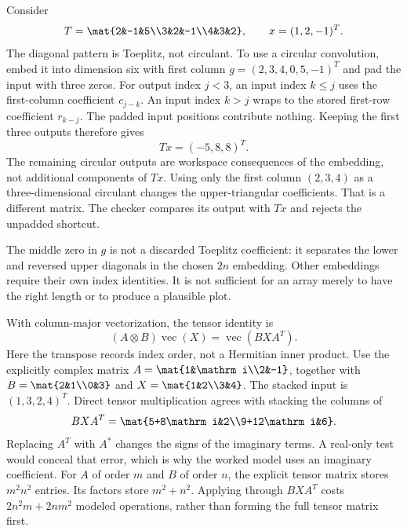 Consider
\[
T=\mat{2&-1&5\\3&2&-1\\4&3&2},\qquad x=(1,2,-1)^T.
\]
The diagonal pattern is Toeplitz, not circulant. To use a circular convolution, embed it into dimension six with first column $g=(2,3,4,0,5,-1)^T$ and pad the input with three zeros.
For output index $j<3$, an input index $k\le j$ uses the first-column coefficient $c_{j-k}$. An input index $k>j$ wraps to the stored first-row coefficient $r_{k-j}$. The padded input positions contribute nothing. Keeping the first three outputs therefore gives
\[
Tx=(-5,8,8)^T.
\]
The remaining circular outputs are workspace consequences of the embedding, not additional components of $Tx$.
Using only the first column $(2,3,4)$ as a three-dimensional circulant changes the upper-triangular coefficients. That is a different matrix. The checker compares its output with $Tx$ and rejects the unpadded shortcut.

The middle zero in $g$ is not a discarded Toeplitz coefficient: it separates the lower and reversed upper diagonals in the chosen $2n$ embedding. Other embeddings require their own index identities. It is not sufficient for an array merely to have the right length or to produce a plausible plot.

With column-major vectorization, the tensor identity is
\[
(A\otimes B)\operatorname{vec}(X)=\operatorname{vec}(BXA^T).
\]
Here the transpose records index order, not a Hermitian inner product. Use the explicitly complex matrix $A=\mat{1&\mathrm i\\2&-1}$, together with $B=\mat{2&1\\0&3}$ and $X=\mat{1&2\\3&4}$.
The stacked input is $(1,3,2,4)^T$. Direct tensor multiplication agrees with stacking the columns of
\[
BXA^T=\mat{5+8\mathrm i&2\\9+12\mathrm i&6}.
\]
Replacing $A^T$ with $A^*$ changes the signs of the imaginary terms. A real-only test would conceal that error, which is why the worked model uses an imaginary coefficient.
For $A$ of order $m$ and $B$ of order $n$, the explicit tensor matrix stores $m^2n^2$ entries. Its factors store $m^2+n^2$. Applying through $BXA^T$ costs $2n^2m+2nm^2$ modeled operations, rather than forming the full tensor matrix first.

